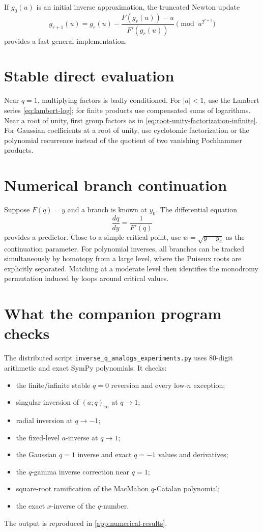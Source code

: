 \documentclass[11pt,oneside]{book}
\theoremstyle{definition}
\theoremstyle{remark}
\begin{document}
If $g_0(u)$ is an initial inverse approximation, the truncated Newton update
\begin{equation}\label{eq:series-newton}
 g_{r+1}(u)=g_r(u)-\frac{F(g_r(u))-u}{F'(g_r(u))}
 \pmod{u^{2^{r+1}}}
\end{equation}
provides a fast general implementation.

\section{Stable direct evaluation}
Near $q=1$, multiplying factors is badly conditioned.  For $|a|<1$, use the
Lambert series \eqref{eq:lambert-log}; for finite products use compensated sums
of logarithms.  Near a root of unity, first group factors as in
\eqref{eq:root-unity-factorization-infinite}.  For Gaussian coefficients at a
root of unity, use cyclotomic factorization or the polynomial recurrence
instead of the quotient of two vanishing Pochhammer products.

\section{Numerical branch continuation}
Suppose $F(q)=y$ and a branch is known at $y_0$.  The differential equation
\[
 \frac{dq}{dy}=\frac1{F'(q)}
\]
provides a predictor.  Close to a simple critical point, use
$w=\sqrt{y-y_c}$ as the continuation parameter.  For polynomial inverses, all
branches can be tracked simultaneously by homotopy from a large level, where
the Puiseux roots are explicitly separated.  Matching at a moderate level
then identifies the monodromy permutation induced by loops around critical
values.

\section{What the companion program checks}
The distributed script \texttt{inverse\_q\_analogs\_experiments.py} uses
80-digit arithmetic and exact SymPy polynomials.  It checks:
\begin{itemize}
\item the finite/infinite stable $q=0$ reversion and every low-$n$ exception;
\item singular inversion of $(a;q)_\infty$ at $q\to1$;
\item radial inversion at $q\to-1$;
\item the fixed-level $a$-inverse at $q\to1$;
\item the Gaussian $q=1$ inverse and exact $q=-1$ values and derivatives;
\item the $q$-gamma inverse correction near $q=1$;
\item square-root ramification of the MacMahon $q$-Catalan polynomial;
\item the exact $x$-inverse of the $q$-number.
\end{itemize}
The output is reproduced in \cref{app:numerical-results}.
\end{document}
